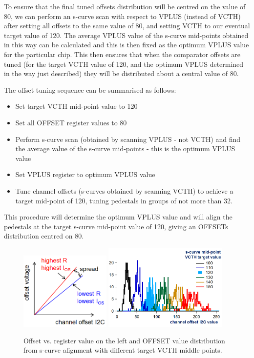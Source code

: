 \documentclass[11pt,a4paper]{article}
\begin{document}
To ensure that the final tuned offsets distribution will be centred on the value of 80, we can perform an s-curve scan with respect to VPLUS (instead of VCTH) after setting all offsets to the same value of 80, and setting VCTH to our eventual target value of 120. The average VPLUS value of the s-curve mid-points obtained in this way can be calculated and this is then fixed as the optimum VPLUS value for the particular chip. This then ensures that when the comparator offsets are tuned (for the target VCTH value of 120, and the optimum VPLUS determined in the way just described) they will be distributed about a central value of 80.

	The offset tuning sequence can be summarised as follows: 

	\begin{itemize}
	\item Set target VCTH mid-point value to 120
	\item Set all OFFSET register values to 80 
	\item Perform s-curve scan (obtained by scanning VPLUS - not VCTH) and find the average value of the s-curve mid-points - this is the optimum VPLUS value
	\item Set VPLUS register to optimum VPLUS value
	\item Tune channel offsets (s-curves obtained by scanning VCTH) to achieve a target mid-point of 120, tuning pedestals in groups of not more than 32.
	\end{itemize}

	This procedure will determine the optimum VPLUS value and will align the pedestals at the target s-curve mid-point value of 120, giving an OFFSETs distribution centred on 80.

	\begin{figure}[htbp]
	\centering
	\includegraphics[width=0.4\textwidth]{fig/OffsetI2c.png}
	\includegraphics[width=0.55\textwidth]{fig/VcthMidI2c.png}
	\caption{Offset vs. register value on the left and OFFSET value distribution from s-curve alignment with different target VCTH middle points. }\label{fig:offset-i2c}
	\end{figure}
\end{document}

